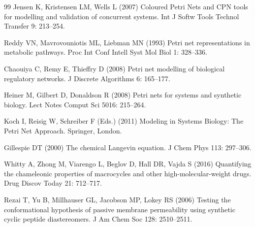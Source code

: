 \documentclass[10pt,letterpaper]{article}
\begin{document}
\begin{thebibliography}{99}
Jensen K, Kristensen LM, Wells L (2007) Coloured Petri Nets and CPN tools for modelling and validation of concurrent systems. Int J Softw Tools Technol Transfer 9: 213--254.

Reddy VN, Mavrovouniotis ML, Liebman MN (1993) Petri net representations in metabolic pathways. Proc Int Conf Intell Syst Mol Biol 1: 328--336.

Chaouiya C, Remy E, Thieffry D (2008) Petri net modelling of biological regulatory networks. J Discrete Algorithms 6: 165--177.

Heiner M, Gilbert D, Donaldson R (2008) Petri nets for systems and synthetic biology. Lect Notes Comput Sci 5016: 215--264.

Koch I, Reisig W, Schreiber F (Eds.) (2011) Modeling in Systems Biology: The Petri Net Approach. Springer, London.

Gillespie DT (2000) The chemical Langevin equation. J Chem Phys 113: 297--306.

Whitty A, Zhong M, Viarengo L, Beglov D, Hall DR, Vajda S (2016) Quantifying the chameleonic properties of macrocycles and other high-molecular-weight drugs. Drug Discov Today 21: 712--717.

Rezai T, Yu B, Millhauser GL, Jacobson MP, Lokey RS (2006) Testing the conformational hypothesis of passive membrane permeability using synthetic cyclic peptide diastereomers. J Am Chem Soc 128: 2510--2511.

\end{thebibliography}
\end{document}
